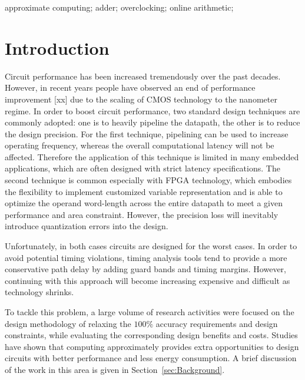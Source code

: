 \documentclass[10pt, conference, compsocconf]{IEEEtran}
\begin{document}
\begin{IEEEkeywords}
approximate computing; adder; overclocking; online arithmetic;

\end{IEEEkeywords}


\section{Introduction}
Circuit performance has been increased tremendously over the past decades. However, in recent years people have observed an end of performance improvement [xx] due to the scaling of CMOS technology to the nanometer regime. In order to boost circuit performance, two standard design techniques are commonly adopted: one is to heavily pipeline the datapath, the other is to reduce the design precision. For the first technique, pipelining can be used to increase operating frequency, whereas the overall computational latency will not be affected. Therefore the application of this technique is limited in many embedded applications, which are often designed with strict latency specifications. The second technique is common especially with FPGA technology, which embodies the flexibility to implement customized variable representation and is able to optimize the operand word-length across the entire datapath to meet a given performance and area constraint. However, the precision loss will inevitably introduce quantization errors into the design.

Unfortunately, in both cases circuits are designed for the worst cases. In order to avoid potential timing violations, timing analysis tools tend to provide a more conservative path delay by adding guard bands and timing margins. However, continuing with this approach will become increasing expensive and difficult as technology shrinks.

To tackle this problem, a large volume of research activities were focused on the design methodology of relaxing the $100\%$ accuracy requirements and design constraints, while evaluating the corresponding design benefits and costs. Studies have shown that computing approximately provides extra opportunities to design circuits with better performance and less energy consumption. A brief discussion of the work in this area is given in Section~\ref{sec:Background}.
\end{document}
